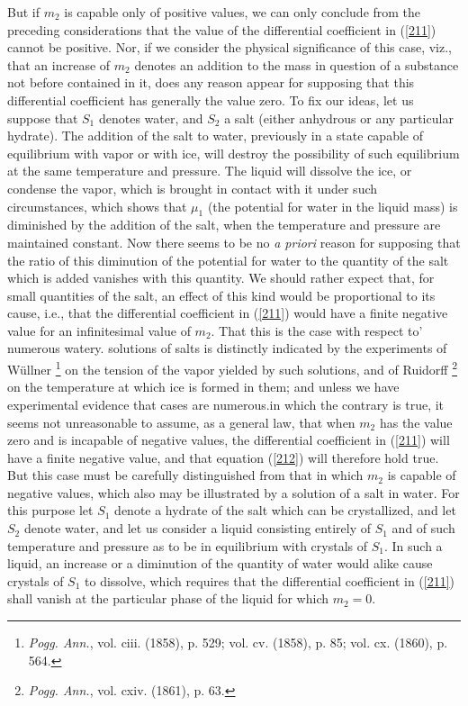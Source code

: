 \documentclass[12pt]{article}
\begin{document}
But if $m_2$ is capable only of positive values, we can only conclude from the preceding considerations that the value of the differential coefficient in (\ref{211}) cannot be positive. Nor, if we consider the physical significance of this case, viz., that an increase of $m_2$ denotes an addition to the mass in question of a substance not before contained in it, does any reason appear for supposing that this differential coefficient has generally the value zero. To fix our ideas, let us suppose that $S_1$ denotes water, and $S_2$ a salt (either anhydrous or any particular hydrate). The addition of the salt to water, previously in a state capable of equilibrium with vapor or with ice, will destroy the possibility of such equilibrium at the same temperature and pressure. The liquid will dissolve the ice, or condense the vapor, which is brought in contact with it under such circumstances, which shows that $\mu_1$ (the potential for water in the liquid mass) is diminished by the addition of the salt, when the temperature and pressure are maintained constant. Now there seems to be no \textit{a priori} reason for supposing that the ratio of this diminution of the potential for water to the quantity of the salt which is added vanishes with this quantity. We should rather expect that, for small quantities of the salt, an effect of this kind would be proportional to its cause, i.e., that the differential coefficient in (\ref{211}) would have a finite negative value for an infinitesimal value of
$m_2$. That this is the case with respect to' numerous watery. solutions of salts is distinctly indicated by the experiments of Wüllner \footnote{\textit{Pogg. Ann.}, vol. ciii. (1858), p. 529; vol. cv. (1858), p. 85; vol. cx. (1860), p. 564.} on the tension of the vapor yielded by such solutions, and of Ruidorff \footnote{\textit{Pogg. Ann.}, vol. cxiv. (1861), p. 63.} on the temperature at which ice is formed in them; and unless we have experimental evidence that cases are numerous.in which the contrary is true, it seems not unreasonable to assume, as a general law, that when $m_2$ has the value zero and is incapable of negative values, the differential coefficient in (\ref{211}) will have a finite negative value, and that equation (\ref{212}) will therefore hold true. But this case must be carefully distinguished from that in which $m_2$ is capable of negative values, which also may be illustrated by a solution of a salt in water. For this purpose let $S_1$ denote a hydrate of the salt which can be crystallized, and let $S_2$ denote water, and let us consider a liquid consisting entirely of $S_1$ and of such temperature and pressure as to be in equilibrium with crystals of $S_1$. In such a liquid, an increase or a diminution of the quantity of water would alike cause crystals of $S_1$ to dissolve, which requires that the differential coefficient in (\ref{211}) shall vanish at the particular phase of the liquid for which $m_2 = 0$.
\end{document}
